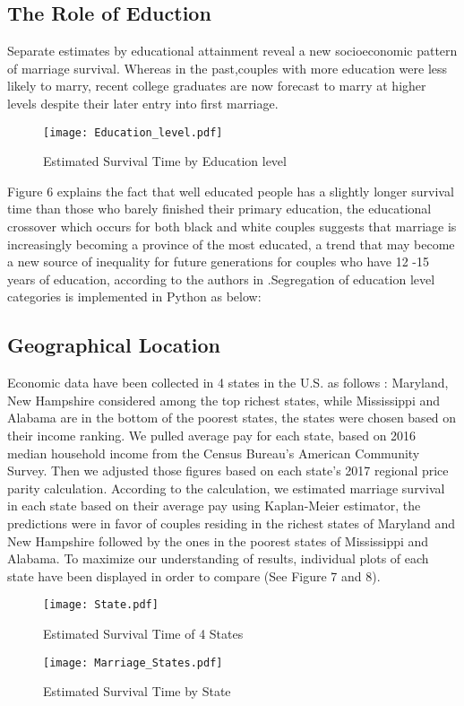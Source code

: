 \documentclass[10pt,twocolumn]{article}
\begin{document}
\subsection{The Role of Eduction}
Separate estimates by educational attainment reveal a new socioeconomic pattern of marriage survival. Whereas in the  past,couples with more education were less likely to marry, recent college graduates are now forecast to marry at higher levels despite their later entry into first marriage.
\begin{figure}[!htb]
\centering
\texttt{[image: Education\_level.pdf]}
\caption{Estimated Survival Time by Education level}
\label{Fig:Survival_Time}
\end{figure}
Figure 6 explains the fact that well educated people has a slightly longer survival time than those who barely finished their primary education, the educational crossover which occurs for both black and white couples suggests that marriage is increasingly becoming a province of the most educated, a trend that may become a new source of inequality for future generations for couples who have 12 -15 years of education, according to the authors in \cite{goldstein2001marriage}.Segregation of education level categories is implemented in Python as below:


\subsection{Geographical Location}
Economic data have been collected in 4 states in the U.S. as follows : Maryland, New Hampshire considered among the top richest states, while Mississippi and Alabama are in the bottom of the poorest states, the states were chosen based on their income ranking. We pulled average pay for each state, based on 2016 median household income from the Census Bureau's American Community Survey. Then we adjusted those figures based on each state’s 2017 regional price parity calculation. According to the calculation, we estimated marriage survival in each state based on their average pay using Kaplan-Meier estimator, the predictions were in favor of couples residing in the richest states of Maryland and New Hampshire followed by the ones in the poorest states of Mississippi and Alabama. To maximize our understanding of results, individual plots of each state have been displayed in order to compare (See Figure 7 and 8).
\begin{figure}[!htb]
\centering
\texttt{[image: State.pdf]}
\caption{Estimated Survival Time of 4 States}
\label{Fig:Survival_Time_State}
\end{figure}
 
\begin{figure}[!htb]
\centering
\texttt{[image: Marriage\_States.pdf]}
\caption{Estimated Survival Time by State}
\label{Fig:Survival_Time_State}
\end{figure}
\end{document}
